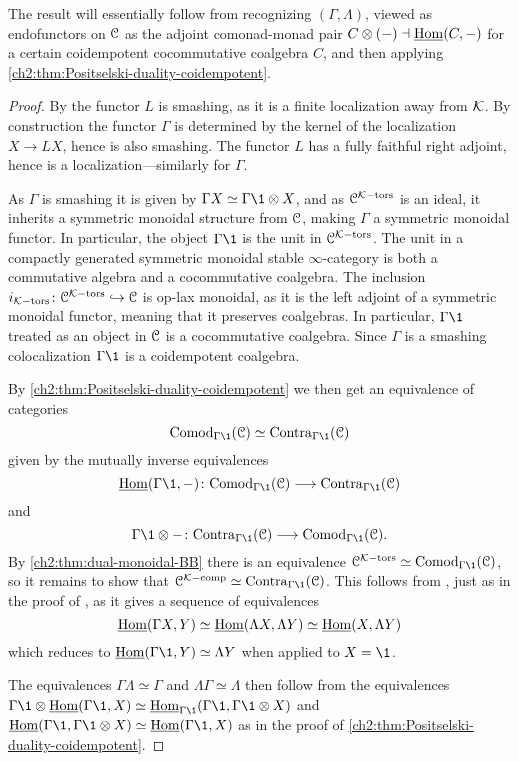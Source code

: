\begin{remark}
    The result will essentially follow from recognizing $(\Gamma, \Lambda)$, viewed as endofunctors on $\EuScript{C}$ as the adjoint comonad-monad pair $C\otimes (-)\dashv \operatorname{\underline{Hom}}(C,-)$ for a certain coidempotent cocommutative coalgebra $C$, and then applying \cref{ch2:thm:Positselski-duality-coidempotent}. 
\end{remark}

\begin{proof}
    By \cite[3.3.3]{hovey-palmiery-strickland_97} the functor $L$ is smashing, as it is a finite localization away from $\mathcal{K}$. By construction the functor $\Gamma$ is determined by the kernel of the localization $X\to LX$, hence is also smashing. The functor $L$ has a fully faithful right adjoint, hence is a localization---similarly for $\Gamma$. 

    As $\Gamma$ is smashing it is given by $\Gamma X \simeq \Gamma \1 \otimes X$, and as $\EuScript{C}^{\mathcal{K}-\mathrm{tors}}$ is an ideal, it inherits a symmetric monoidal structure from $\EuScript{C}$, making $\Gamma$ a symmetric monoidal functor. In particular, the object $\Gamma \1$ is the unit in $\EuScript{C}^{\mathcal{K}-\mathrm{tors}}$. The unit in a compactly generated symmetric monoidal stable $\infty$-category is both a commutative algebra and a cocommutative coalgebra. The inclusion $i_{\mathcal{K}-\mathrm{tors}}\colon \EuScript{C}^{\mathcal{K}-\mathrm{tors}}\hookrightarrow \EuScript{C}$ is op-lax monoidal, as it is the left adjoint of a symmetric monoidal functor, meaning that it preserves coalgebras. In particular, $\Gamma\1$ treated as an object in $\EuScript{C}$ is a cocommutative coalgebra. Since $\Gamma$ is a smashing colocalization $\Gamma \1$ is a coidempotent coalgebra. 

    By \cref{ch2:thm:Positselski-duality-coidempotent} we then get an equivalence of categories 
    \[\Comod_{\Gamma \1}(\C) \simeq \Contra_{\Gamma \1}(\C)\]
    given by the mutually inverse equivalences 
    \[\iHom(\Gamma \1,-)\: \Comod_{\Gamma\1}(\C) \to \Contra_{\Gamma \1}(\C)\] 
    and 
    \[\Gamma \1\otimes -\: \Contra_{\Gamma\1}(\C) \to \Comod_{\Gamma \1}(\C).\]
    By \cref{ch2:thm:dual-monoidal-BB} there is an equivalence $\C\Ktors\simeq \Comod_{\Gamma\1}(\C)$, so it remains to show that $\C\Kcomp\simeq \Contra_{\Gamma \1}(\C)$. This follows from \cite[2.2]{barthel-heard-valenzuela_2018}, just as in the proof of \cite[2.21(4)]{barthel-heard-valenzuela_2018}, as it gives a sequence of equivalences 
    \[\operatorname{\underline{Hom}}(\Gamma X, Y) \simeq \operatorname{\underline{Hom}}(\Lambda X, \Lambda Y)\simeq \operatorname{\underline{Hom}}(X, \Lambda Y)\]
    which reduces to $\iHom(\Gamma \1, Y) \simeq \Lambda Y$ when applied to $X=\1$. 

    The equivalences $\Gamma \Lambda \simeq \Gamma$ and $\Lambda\Gamma \simeq \Lambda$ then follow from the equivalences $\Gamma \1 \otimes \iHom(\Gamma\1, X)\simeq \iHom_{\Gamma\1}(\Gamma\1, \Gamma\1\otimes X)$ and $\iHom(\Gamma\1, \Gamma\1\otimes X)\simeq \iHom(\Gamma \1, X)$ as in the proof of \cref{ch2:thm:Positselski-duality-coidempotent}. 
\end{proof}

